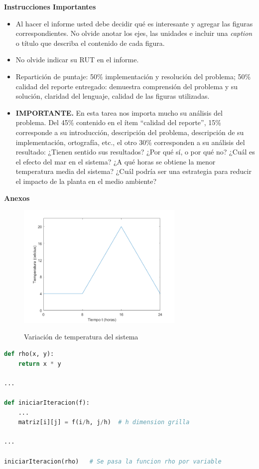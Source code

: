\documentclass[letterpaper, 11pt]{article}
\newcommand{\newtitle}[1]{\noindent\Large{\textbf{#1}}\\\vspace*{-0.5em}\normalsize}
\begin{document}
\vspace{0.5em}
\newtitle{Instrucciones Importantes}
\begin{itemize}
\item Al hacer el informe usted debe decidir qué es interesante y
  agregar las figuras correspondientes. No olvide anotar los ejes, las unidades e incluir una \emph{caption} o título que describa el contenido de cada figura.
  
 \item No olvide indicar su RUT en el informe.

 \item Repartición de puntaje: 50\% implementación y resolución del problema; 50\% calidad del reporte entregado: demuestra comprensión del problema y su solución, claridad del lenguaje, calidad de las figuras utilizadas.

 \item \textbf{IMPORTANTE.} En esta tarea nos importa mucho su análisis del
   problema. Del 45\% contenido en el ítem ``calidad del reporte'', 15\%
   corresponde a su introducción, descripción del problema, descripción de su
   implementación, ortografía, etc., el otro 30\% corresponden a su análisis
   del resultado: ¿Tienen sentido sus resultados?  ¿Por qué sí, o por qué no?
   ¿Cuál es el efecto del mar en el sistema? ¿A qué horas se obtiene la menor
   temperatura media del sistema? ¿Cuál podría ser una estrategia para reducir
   el impacto de la planta en el medio ambiente?

\end{itemize}

\vspace{0.5em}
\newtitle{Anexos}

\begin{figure}[H]
	\centering
	\includegraphics[width=8cm]{temperatura}
	\label{temp}
	\caption{Variación de temperatura del sistema}
\end{figure}

\lstset{
	style=Python
}
\begin{lstlisting}[language=Python,caption={Ejemplo paso función por argumento}]
def rho(x, y):
	return x * y
	
...

def iniciarIteracion(f):
	...
	matriz[i][j] = f(i/h, j/h)	# h dimension grilla
	
...

iniciarIteracion(rho)	# Se pasa la funcion rho por variable
\end{lstlisting}

\end{document}
